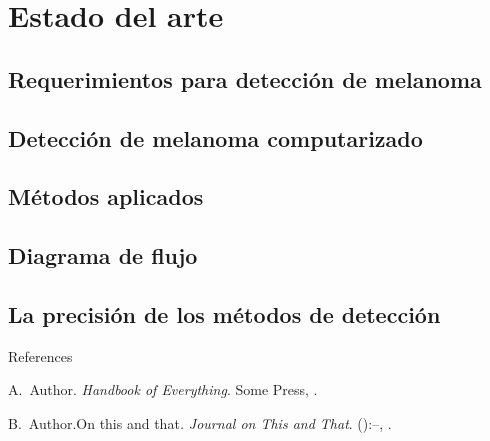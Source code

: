\documentclass{beamer}
\begin{document}
\section{Estado del arte}
\subsection{Requerimientos para detección de melanoma}

\begin{frame}

\end{frame}

\subsection{Detección de melanoma computarizado }

\begin{frame}

\end{frame}

\subsection{Métodos aplicados }

\begin{frame}

\end{frame}

\subsection{Diagrama de flujo }

\begin{frame}

\end{frame}

\subsection{La precisión de los métodos de detección }

\begin{frame}
\end{frame}


\begin{frame}{References}
	\begin{thebibliography}{2}
		\beamertemplatebookbibitems
		A.\ Author. \newblock\emph{Handbook of Everything}.\newblock
\textlatin{Some Press, }.

		\beamertemplatearticlebibitems
		B.\ Author.\newblock On this and that\emph{.}
\newblock\emph{Journal on This and That}. 
():--, 
.
	\end{thebibliography}
\end{frame}

\end{document}

